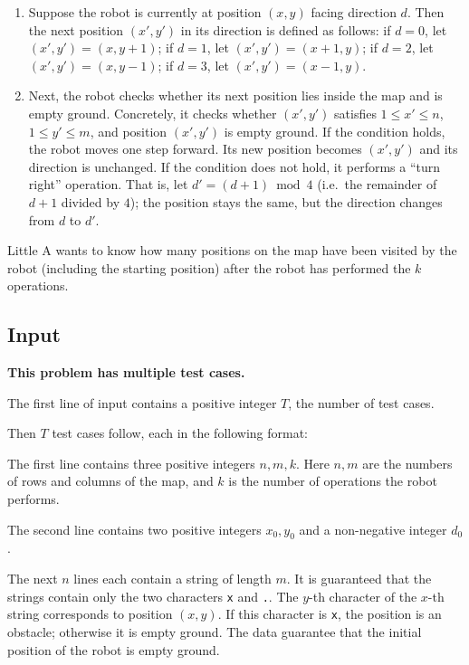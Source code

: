 \documentclass[11pt]{article}
\begin{document}
\begin{enumerate}
\item Suppose the robot is currently at position $(x, y)$ facing
direction $d$.
Then the next position $(x', y')$ in its direction is defined as follows:
if $d = 0$, let $(x', y') = (x, y + 1)$;
if $d = 1$, let $(x', y') = (x + 1, y)$;
if $d = 2$, let $(x', y') = (x, y - 1)$;
if $d = 3$, let $(x', y') = (x - 1, y)$.
\item Next, the robot checks whether its next position lies inside the map
and is empty ground.
Concretely, it checks whether $(x', y')$ satisfies
$1 \leq x' \leq n$, $1 \leq y' \leq m$, and position $(x', y')$ is empty
ground.
If the condition holds, the robot moves one step forward.
Its new position becomes $(x', y')$ and its direction is unchanged.
If the condition does not hold, it performs a ``turn right'' operation.
That is, let $d' = (d + 1) \bmod 4$ (i.e.\ the remainder of $d + 1$
divided by $4$); the position stays the same, but the direction changes
from $d$ to $d'$.
\end{enumerate}

Little A wants to know how many positions on the map have been visited by
the robot (including the starting position) after the robot has performed
the $k$ operations.

\subsection*{Input}

\textbf{This problem has multiple test cases.}

The first line of input contains a positive integer $T$, the number of test
cases.

Then $T$ test cases follow, each in the following format:

The first line contains three positive integers $n, m, k$.
Here $n, m$ are the numbers of rows and columns of the map, and $k$ is the
number of operations the robot performs.

The second line contains two positive integers $x_0, y_0$ and a
non-negative integer $d_0$.

The next $n$ lines each contain a string of length $m$.
It is guaranteed that the strings contain only the two characters
\texttt{x} and \texttt{.}.
The $y$-th character of the $x$-th string corresponds to position $(x, y)$.
If this character is \texttt{x}, the position is an obstacle; otherwise it
is empty ground.
The data guarantee that the initial position of the robot is empty ground.
\end{document}
